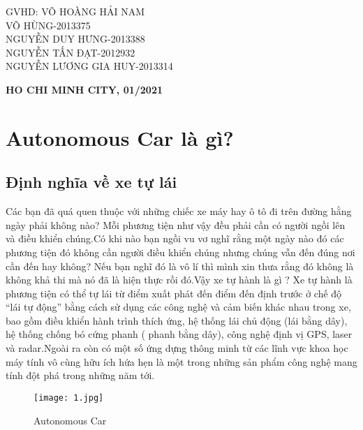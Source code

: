 \documentclass[18pt]{article}
\begin{document}
\begin{titlepage}
\begin{center}
\begin{tabular}{c}
		\end{tabular}
		\end{center}
	
	
	\vspace{1cm}

    \begin{center}
        GVHD: VÕ HOÀNG HẢI NAM\\
        VÕ HÙNG-2013375\\
        NGUYỄN DUY HƯNG-2013388\\
        NGUYỄN TẤN ĐẠT-2012932\\
        NGUYỄN LƯƠNG GIA HUY-2013314
        
    \end{center}
	
	
	        
	    
	
	\begin{center}
		\bf{ {\large HO CHI MINH CITY, 01/2021}}\\
	\end{center}
	\end{titlepage}

\newpage
\tableofcontents
\newpage
\listoffigures
\newpage
\section{Autonomous Car là gì?\cite{link}}

\subsection{Định nghĩa về xe tự lái}
 Các bạn đã quá quen thuộc với những chiếc xe máy hay ô tô đi trên đường hằng ngày phải không nào? Mỗi phương tiện như vậy đều phải cần có người ngồi lên và điều khiển chúng.Có khi nào bạn ngồi vu vơ nghĩ rằng một ngày nào đó các phương tiện đó không cần người điều khiển chúng nhưng chúng vẫn đến đúng nơi cần đến hay không? Nếu bạn nghĩ đó là vô lí thì mình xin thưa rằng đó không là không khả thi mà nó đã là hiện thực rồi đó.Vậy xe tự hành là gì ? Xe tự hành là phương tiện có thể tự lái từ điểm xuất phát đến điểm đến định trước ở chế độ “lái tự động” bằng cách sử dụng các công nghệ và cảm biến khác nhau trong xe, bao gồm điều khiển hành trình thích ứng, hệ thống lái chủ động (lái bằng dây), hệ thống chống bó cứng phanh ( phanh bằng dây), công nghệ định vị GPS, laser và radar.Ngoài ra còn có một số ứng dựng thông minh từ các lĩnh vực khoa học máy tính vô cùng hữu ích hứa hẹn là một trong những sản phẩm công nghệ mang tính đột phá trong những năm tới.
 \begin{figure}[h]
\centering 
\texttt{[image: 1.jpg]} 
\caption{Autonomous Car} 
\label{dinhnghia} 
\end{figure}
\end{document}
